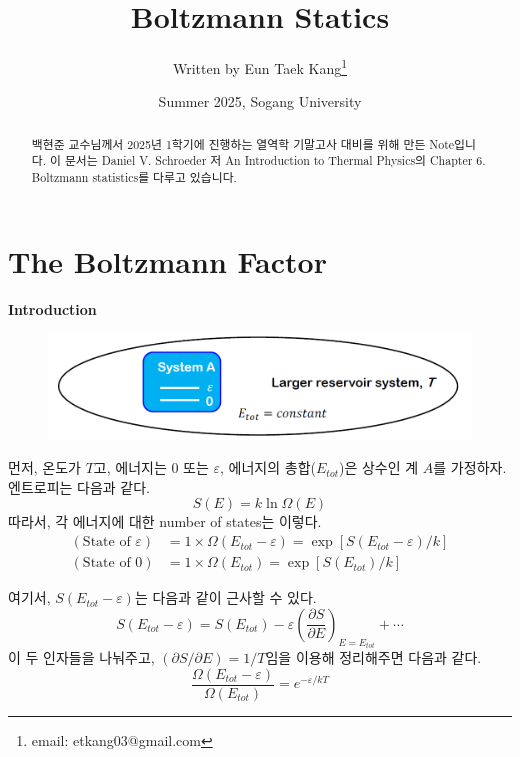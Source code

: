 \documentclass{article}
\title{\textsf{Boltzmann Statics}}
\author[1]{Written by Eun Taek Kang\thanks{email: etkang03@gmail.com}}
\affil[1]{Department of Physics, Sogang University, Seoul 04107, Korea}
\date{Summer 2025, Sogang University}
\newcommand{\ve}{\varepsilon}
\begin{document}
\pagestyle{fancy}
    \fancyhf{}
    \fancyfoot[C]{\thepage}

\maketitle

\begin{abstract}
    백현준 교수님께서 2025년 1학기에 진행하는 열역학 기말고사 대비를 위해 만든 Note입니다. 이 문서는 Daniel V. Schroeder 저 An Introduction to Thermal Physics의 Chapter 6. Boltzmann statistics를 다루고 있습니다.
\end{abstract}

\newpage

\section{The Boltzmann Factor}

\textbf{Introduction}

\begin{figure}[h]
    \centering
    \includegraphics[width=0.65\linewidth]{images/fig1_1.png}
\end{figure}

먼저, 온도가 $T$고, 에너지는 0 또는 $\ve$, 에너지의 총합($E_{tot}$)은 상수인 계 $A$를 가정하자. 엔트로피는 다음과 같다.
\begin{equation}\label{eq:1-1}
    S(E) = k \ln \Omega (E)
\end{equation}
따라서, 각 에너지에 대한 number of states는 이렇다.
\begin{align}
    (\text{State of $\ve$}) &= 1 \times \Omega(E_{tot} - \ve) = \exp[S(E_{tot} - \ve) / k]\\
    (\text{State of $0$}) &= 1 \times \Omega(E_{tot}) = \exp [S(E_{tot})/k]
\end{align}

\noindent
여기서, $S(E_{tot} - \ve)$는 다음과 같이 근사할 수 있다.
\begin{equation}
    S(E_{tot} - \ve) = S(E_{tot}) - \ve \left( \frac{\partial S}{\partial E} \right)_{E=E_{tot}} + \cdots
\end{equation}
이 두 인자들을 나눠주고, $(\partial S/ \partial E) = 1/T$임을 이용해 정리해주면 다음과 같다.
\begin{equation}
    \frac{\Omega (E_{tot} - \ve)}{\Omega (E_{tot})} = e^{-\ve / kT}
\end{equation}
\end{document}
